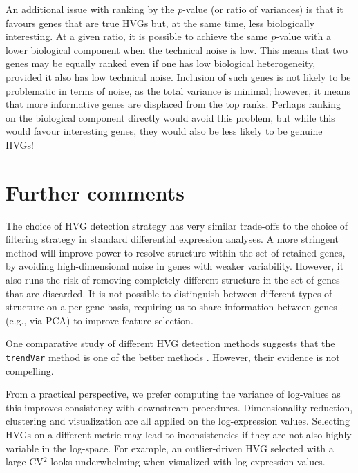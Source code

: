 \documentclass{article}
\newcommand\code[1]{{\small\texttt{#1}}}
\begin{document}
An additional issue with ranking by the $p$-value (or ratio of variances) is that it favours genes that are true HVGs but, at the same time, less biologically interesting.
At a given ratio, it is possible to achieve the same $p$-value with a lower biological component when the technical noise is low.
This means that two genes may be equally ranked even if one has low biological heterogeneity, provided it also has low technical noise.
Inclusion of such genes is not likely to be problematic in terms of noise, as the total variance is minimal;
however, it means that more informative genes are displaced from the top ranks.
Perhaps ranking on the biological component directly would avoid this problem, but while this would favour interesting genes, they would also be less likely to be genuine HVGs!

\section{Further comments}
The choice of HVG detection strategy has very similar trade-offs to the choice of filtering strategy in standard differential expression analyses.
A more stringent method will improve power to resolve structure within the set of retained genes, by avoiding high-dimensional noise in genes with weaker variability.
However, it also runs the risk of removing completely different structure in the set of genes that are discarded.
It is not possible to distinguish between different types of structure on a per-gene basis,
requiring us to share information between genes (e.g., via PCA) to improve feature selection.

One comparative study of different HVG detection methods suggests that the \code{trendVar} method is one of the better methods \citep{yip2018evaluation}.
However, their evidence is not compelling.

From a practical perspective, we prefer computing the variance of log-values as this improves consistency with downstream procedures.
Dimensionality reduction, clustering and visualization are all applied on the log-expression values.
Selecting HVGs on a different metric may lead to inconsistencies if they are not also highly variable in the log-space.
For example, an outlier-driven HVG selected with a large CV$^2$ looks underwhelming when visualized with log-expression values.



\end{document}
